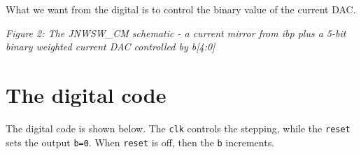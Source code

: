 What we want from the digital is to control the binary value of the
current DAC.


{
\centering
{}
}

\emph{Figure 2: The JNWSW\_CM schematic - a current mirror from ibp plus
a 5-bit binary weighted current DAC controlled by b{[}4:0{]}}

\section{The digital code}\label{the-digital-code}

The digital code is shown below. The \texttt{clk} controls the stepping,
while the \texttt{reset} sets the output \texttt{b=0}. When
\texttt{reset} is off, then the \texttt{b} increments.

\begin{Shaded}
\begin{Highlighting}[]
\OperatorTok{(}
            \OperatorTok{,}
            \OperatorTok{,}
           \OperatorTok{[}\OperatorTok{:}\OperatorTok{]}
           \OperatorTok{);}

\OperatorTok{=} \OperatorTok{;}

\OperatorTok{)} 
      \OperatorTok{(}\OperatorTok{)}
\OperatorTok{\textless{}=} \OperatorTok{;}
\OperatorTok{\textless{}=} \OperatorTok{;}

\OperatorTok{)} 
      \OperatorTok{(}\OperatorTok{)}
\OperatorTok{\textless{}=} \OperatorTok{;}
\OperatorTok{\textless{}=}\OperatorTok{+} \OperatorTok{;}
    
\end{Highlighting}
\end{Shaded}

